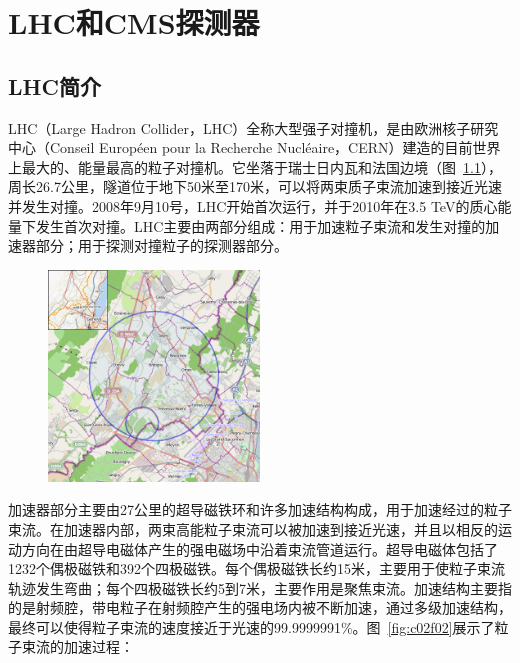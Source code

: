 
\chapter{LHC和CMS探测器}

\section{LHC简介}

LHC（Large Hadron Collider，LHC）全称大型强子对撞机，是由欧洲核子研究中心（Conseil Européen pour la Recherche Nucléaire，CERN）建造的目前世界上最大的、能量最高的粒子对撞机。它坐落于瑞士日内瓦和法国边境（图~\ref{fig:c02f01}），周长26.7公里，隧道位于地下50米至170米，可以将两束质子束流加速到接近光速并发生对撞。2008年9月10号，LHC开始首次运行，并于2010年在3.5 TeV的质心能量下发生首次对撞。LHC主要由两部分组成：用于加速粒子束流和发生对撞的加速器部分；用于探测对撞粒子的探测器部分。

\begin{figure}[!htbp]
    \centering
    \includegraphics[width=0.5\textwidth]{figures/chapter02/Location_Large_Hadron_Collider.png}
    \label{fig:c02f01}
\end{figure}

加速器部分主要由27公里的超导磁铁环和许多加速结构构成，用于加速经过的粒子束流。在加速器内部，两束高能粒子束流可以被加速到接近光速，并且以相反的运动方向在由超导电磁体产生的强电磁场中沿着束流管道运行。超导电磁体包括了1232个偶极磁铁和392个四极磁铁。每个偶极磁铁长约15米，主要用于使粒子束流轨迹发生弯曲；每个四极磁铁长约5到7米，主要作用是聚焦束流。加速结构主要指的是射频腔，带电粒子在射频腔产生的强电场内被不断加速，通过多级加速结构，最终可以使得粒子束流的速度接近于光速的99.9999991\%。图~\ref{fig:c02f02}展示了粒子束流的加速过程：

